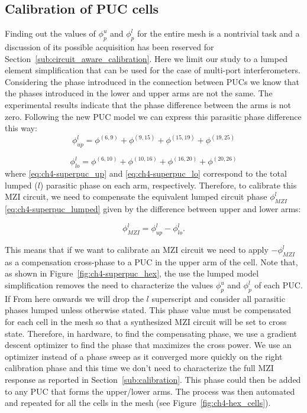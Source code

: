 \subsection{Calibration of PUC cells}\label{sub:calibration_of_puc_cells} %

Finding out the values of \(\phi^u_p\) and \(\phi^l_p\) for the entire mesh is a nontrivial task and a discussion of its possible acquisition has been reserved for Section~\ref{sub:circuit_aware_calibration}.
Here we limit our study to a lumped element simplification that can be used for the case of multi-port interferometers.
Considering the phase introduced in the connection between PUCs we know that the phases introduced in the lower and upper arms are not the same.
The experimental results indicate that the phase difference between the arms is not zero.
Following the new PUC model we can express this parasitic phase difference this way:
\begin{equation}
	\phi^l_{up} = \phi^{(6,9)} + \phi^{(9,15)} + \phi^{(15,19)} + \phi^{(19,25)}
	\label{eq:ch4-superpuc_up}
\end{equation}

\begin{equation}
	\phi^l_{lo} = \phi^{(6,10)} + \phi^{(10,16)} + \phi^{(16,20)} + \phi^{(20,26)}
	\label{eq:ch4-superpuc_lo}
\end{equation}
where \eqref{eq:ch4-superpuc_up} and \eqref{eq:ch4-superpuc_lo} correspond to the total lumped (\(l\)) parasitic phase on each arm, respectively.
Therefore, to calibrate this MZI circuit, we need to compensate the equivalent lumped circuit phase \(\phi^l_{MZI}\) \eqref{eq:ch4-superpuc_lumped} given by the difference between upper and lower arms:

\begin{equation}
	\phi^l_{MZI} = \phi^l_{up} - \phi^l_{lo}.
	\label{eq:ch4-superpuc_lumped}
\end{equation}

This means that if we want to calibrate an MZI circuit we need to apply \(-\phi^l_{MZI}\) as a compensation cross-phase to a PUC in the upper arm of the cell.
Note that, as shown in Figure~\ref{fig:ch4-superpuc_hex}, the use the lumped model simplification removes the need to characterize the values \(\phi^u_p\) and \(\phi^l_p\) of each PUC.
If From here onwards we will drop the \(l\) superscript and consider all parasitic phases lumped unless otherwise stated.
This phase value must be compensated for each cell in the mesh so that a synthesized MZI circuit will be set to cross state.
Therefore, in hardware, to find the compensating phase, we use a gradient descent optimizer \cite{noauthor_optimization_nodate} to find the phase that maximizes the cross power.
We use an optimizer instead of a phase sweep as it converged more quickly on the right calibration phase and this time we don't need to characterize the full MZI response as reported in Section~\ref{sub:calibration}.
This phase could then be added to any PUC that forms the upper/lower arms.
The process was then automated and repeated for all the cells in the mesh (see Figure~\ref{fig:ch4-hex_cells}).

